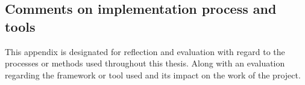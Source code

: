 \begin{appendices}



\chapter{Comments on implementation process and tools}

\label{ap:implementation_process}
This appendix is designated for reflection and evaluation with regard to the processes or methods used throughout this thesis. Along with an evaluation regarding the framework or tool used and its impact on the work of the project.







\end{appendices}
